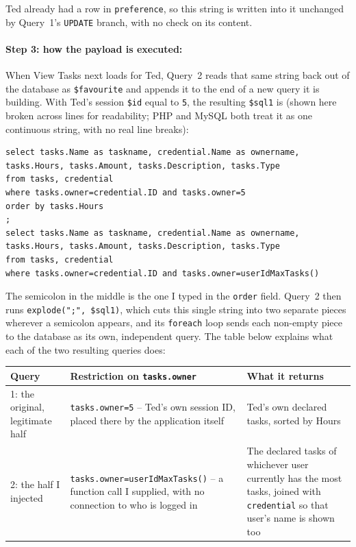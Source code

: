 Ted already had a row in \texttt{preference}, so this string is written into
it unchanged by Query~1's \texttt{UPDATE} branch, with no check on its
content.

\paragraph{Step 3: how the payload is executed:} When View Tasks next loads
for Ted, Query~2 reads that same string back out of the database as
\texttt{\$favourite} and appends it to the end of a new query it is
building. With Ted's session \texttt{\$id} equal to \texttt{5}, the
resulting \texttt{\$sql1} is (shown here broken across lines for
readability; PHP and MySQL both treat it as one continuous string, with no
real line breaks):

\begin{lstlisting}[language={[MySQL]SQL}]
select tasks.Name as taskname, credential.Name as ownername, tasks.Hours, tasks.Amount, tasks.Description, tasks.Type
from tasks, credential
where tasks.owner=credential.ID and tasks.owner=5
order by tasks.Hours
;
select tasks.Name as taskname, credential.Name as ownername, tasks.Hours, tasks.Amount, tasks.Description, tasks.Type
from tasks, credential
where tasks.owner=credential.ID and tasks.owner=userIdMaxTasks()
\end{lstlisting}

The semicolon in the middle is the one I typed in the \texttt{order} field.
Query~2 then runs \texttt{explode(";", \$sql1)}, which cuts this single
string into two separate pieces wherever a semicolon appears, and its
\texttt{foreach} loop sends each non-empty piece to the database as its own,
independent query. The table below explains what each of the two resulting
queries does:

{\footnotesize
\begin{tabularx}{\linewidth}{lXX}
\toprule
\textbf{Query} & \textbf{Restriction on \texttt{tasks.owner}} & \textbf{What it returns} \\
\midrule
1: the original, legitimate half & \texttt{tasks.owner=5} -- Ted's own session ID, placed there by the application itself & Ted's own declared tasks, sorted by Hours \\
2: the half I injected & \texttt{tasks.owner=userIdMaxTasks()} -- a function call I supplied, with no connection to who is logged in & The declared tasks of whichever user currently has the most tasks, joined with \texttt{credential} so that user's name is shown too \\
\bottomrule
\end{tabularx}
\par}

